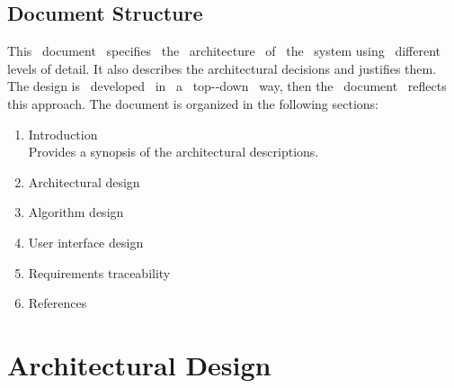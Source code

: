 \documentclass[a4paper,11pt]{report} %
\begin{document}
	\subsection{Document Structure} This  document  specifies  the  architecture  of  the  system  using  different levels of detail. It also describes the architectural decisions and justifies them. The design is  developed  in  a  top-­‐down  way, then the  document  reflects this approach.
	The document is organized in the following sections:
	\begin{enumerate}
		\item Introduction\\
		Provides a synopsis of the architectural descriptions.
		\item Architectural design
		\item Algorithm design
		\item User interface design
		\item Requirements traceability
		\item References
		
	\end{enumerate} 
	
	\section{Architectural Design}
	
\end{document}
